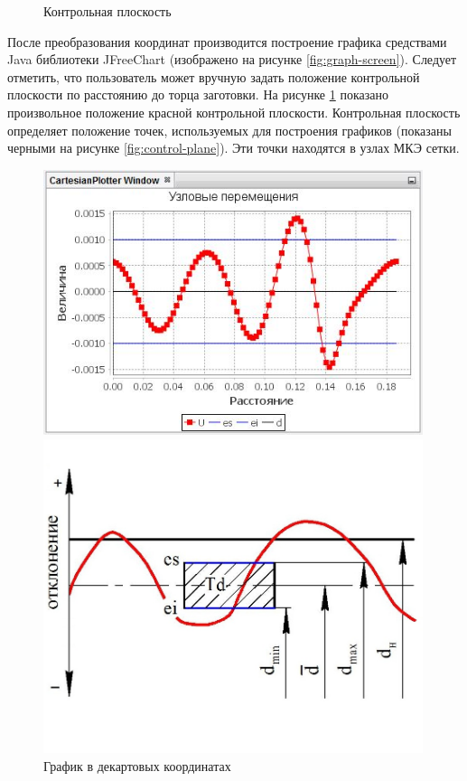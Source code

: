 \documentclass[14pt,oneside,final]{extreport}
\begin{document}
\begin{figure}[t!]
\begin{minipage}[b!]{0.5\textwidth}
			\caption{Контрольная плоскость}
			\label{fig:viewport-screen2}	
		\end{minipage}
	\end{figure}
	
	После преобразования координат производится построение графика средствами Java библиотеки JFreeChart (изображено на рисунке \ref{fig:graph-screen}). Следует отметить, что пользователь может вручную задать  положение контрольной плоскости по расстоянию до торца заготовки. На рисунке  \ref{fig:viewport-screen2} показано произвольное положение красной контрольной плоскости. Контрольная плоскость определяет положение точек, используемых для построения графиков (показаны черными на рисунке \ref{fig:control-plane}). Эти точки находятся в узлах МКЭ сетки. 
	
	
	\begin{figure}[b!]
		\centering	
		\noindent
		\begin{minipage}[b!]{0.55\textwidth}
			\includegraphics[width=0.99\textwidth]{img/cartesian-graph} 
			\caption{График в декартовых координатах}
			\label{fig:cartesian-graph}
		\end{minipage}%
		\begin{minipage}[b!]{0.45\textwidth}
			\includegraphics[width=0.99\textwidth]{img/tolerance} 

\end{minipage}
\end{figure}
\end{document}
